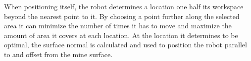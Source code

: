 When positioning itself, the robot determines a location one half its workspace beyond the nearest point to it. By choosing a point further along the selected area it can minimize the number of times it has to move and maximize the amount of area it covers at each location. At the location it determines to be optimal, the surface normal is calculated and used to position the robot parallel to and offset from the mine surface.\\
